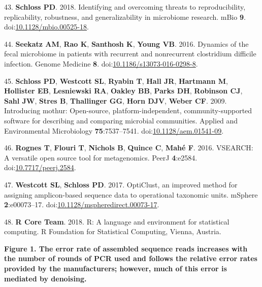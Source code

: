 \documentclass[11pt,]{article}
\begin{document}
\leavevmode\hypertarget{ref-Schloss2018}{}%
43. \textbf{Schloss PD}. 2018. Identifying and overcoming threats to
reproducibility, replicability, robustness, and generalizability in
microbiome research. mBio \textbf{9}.
doi:\href{https://doi.org/10.1128/mbio.00525-18}{10.1128/mbio.00525-18}.

\leavevmode\hypertarget{ref-Seekatz2016}{}%
44. \textbf{Seekatz AM}, \textbf{Rao K}, \textbf{Santhosh K},
\textbf{Young VB}. 2016. Dynamics of the fecal microbiome in patients
with recurrent and nonrecurrent clostridium difficile infection. Genome
Medicine \textbf{8}.
doi:\href{https://doi.org/10.1186/s13073-016-0298-8}{10.1186/s13073-016-0298-8}.

\leavevmode\hypertarget{ref-Schloss2009}{}%
45. \textbf{Schloss PD}, \textbf{Westcott SL}, \textbf{Ryabin T},
\textbf{Hall JR}, \textbf{Hartmann M}, \textbf{Hollister EB},
\textbf{Lesniewski RA}, \textbf{Oakley BB}, \textbf{Parks DH},
\textbf{Robinson CJ}, \textbf{Sahl JW}, \textbf{Stres B},
\textbf{Thallinger GG}, \textbf{Horn DJV}, \textbf{Weber CF}. 2009.
Introducing mothur: Open-source, platform-independent,
community-supported software for describing and comparing microbial
communities. Applied and Environmental Microbiology
\textbf{75}:7537--7541.
doi:\href{https://doi.org/10.1128/aem.01541-09}{10.1128/aem.01541-09}.

\leavevmode\hypertarget{ref-Rognes2016}{}%
46. \textbf{Rognes T}, \textbf{Flouri T}, \textbf{Nichols B},
\textbf{Quince C}, \textbf{Mahé F}. 2016. VSEARCH: A versatile open
source tool for metagenomics. PeerJ \textbf{4}:e2584.
doi:\href{https://doi.org/10.7717/peerj.2584}{10.7717/peerj.2584}.

\leavevmode\hypertarget{ref-Westcott2017}{}%
47. \textbf{Westcott SL}, \textbf{Schloss PD}. 2017. OptiClust, an
improved method for assigning amplicon-based sequence data to
operational taxonomic units. mSphere \textbf{2}:e00073--17.
doi:\href{https://doi.org/10.1128/mspheredirect.00073-17}{10.1128/mspheredirect.00073-17}.

\leavevmode\hypertarget{ref-r_citation_2018}{}%
48. \textbf{R Core Team}. 2018. R: A language and environment for
statistical computing. R Foundation for Statistical Computing, Vienna,
Austria.

\newpage

\textbf{Figure 1. The error rate of assembled sequence reads increases
with the number of rounds of PCR used and follows the relative error
rates provided by the manufacturers; however, much of this error is
mediated by denoising.}
\end{document}
